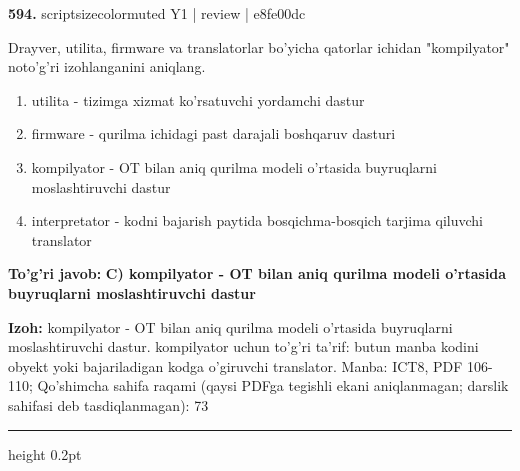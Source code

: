 \documentclass[10pt,a4paper]{article}
\begin{document}
{\bfseries\sffamily\color{ink} 594.} {scriptsizecolor{muted} Y1 | review | e8fe00dc}
\par
Drayver, utilita, firmware va translatorlar bo'yicha qatorlar ichidan "kompilyator" noto'g'ri izohlanganini aniqlang.
\begin{enumerate}[label=\Alph*),leftmargin=9mm]
\item utilita - tizimga xizmat ko'rsatuvchi yordamchi dastur
\item firmware - qurilma ichidagi past darajali boshqaruv dasturi
\item kompilyator - OT bilan aniq qurilma modeli o'rtasida buyruqlarni moslashtiruvchi dastur
\item interpretator - kodni bajarish paytida bosqichma-bosqich tarjima qiluvchi translator
\end{enumerate}
\begin{tcolorbox}[enhanced,breakable,colback=teal!4,colframe=teal!60!black,boxrule=0.45pt,arc=1.2mm,left=2.7mm,right=2.7mm,top=1.8mm,bottom=1.8mm,before skip=2mm,after skip=2mm]
{\bfseries\sffamily\color{teal}To'g'ri javob:} \textbf{C) kompilyator - OT bilan aniq qurilma modeli o'rtasida buyruqlarni moslashtiruvchi dastur}
\par\smallskip
{\bfseries Izoh:} kompilyator - OT bilan aniq qurilma modeli o'rtasida buyruqlarni moslashtiruvchi dastur. kompilyator uchun to'g'ri ta'rif: butun manba kodini obyekt yoki bajariladigan kodga o'giruvchi translator. Manba: ICT8, PDF 106-110; Qo'shimcha sahifa raqami (qaysi PDFga tegishli ekani aniqlanmagan; darslik sahifasi deb tasdiqlanmagan): 73
\end{tcolorbox}
\vspace{2mm}\hrule height 0.2pt\vspace{3mm}
\end{document}
